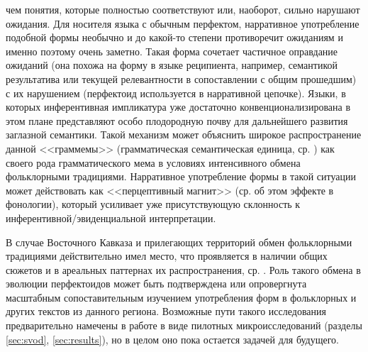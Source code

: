 чем понятия, которые полностью соответствуют или, наоборот, сильно нарушают ожидания. Для носителя языка с обычным перфектом, нарративное употребление подобной формы необычно и до какой-то степени противоречит ожиданиям и именно поэтому очень заметно. Такая форма сочетает частичное оправдание ожиданий (она похожа на форму в языке реципиента, например, семантикой результатива или текущей релевантности в сопоставлении с общим прошедшим) с их нарушением (перфектоид используется в нарративной цепочке). Языки, в которых инферентивная импликатура уже достаточно конвенционализирована в этом плане представляют особо плодородную почву для дальнейшего развития заглазной семантики. Такой механизм может объяснить широкое распространение данной <<граммемы>> (грамматическая семантическая единица, ср. ) как своего рода грамматического мема \citep{boyer2001} в условиях интенсивного обмена фольклорными традициями. Нарративное употребление формы в такой ситуации может действовать как <<перцептивный магнит>> (ср. \citep{blevins2017} об этом эффекте в фонологии), который усиливает уже присутствующую склонность к инферентивной/эвиденциальной интерпретации.
\par В случае Восточного Кавказа и прилегающих территорий обмен фольклорными традициями действительно имел место, что проявляется в наличии общих сюжетов и в ареальных паттернах их распространения, ср. \citep{adzhiev1991intro}. Роль такого обмена в эволюции перфектоидов может быть подтверждена или опровергнута масштабным сопоставительным изучением употребления форм в фольклорных и других текстов из данного региона. Возможные пути такого исследования предварительно намечены в работе в виде пилотных микроисследований (разделы \ref{sec:svod}, \ref{sec:results}), но в целом оно пока остается задачей для будущего.

